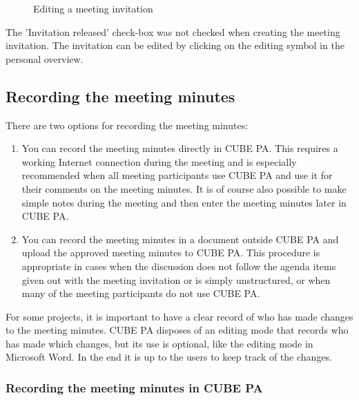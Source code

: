 \begin{figure}[H]
\caption{Editing a meeting invitation}
\end{figure}

\begin{small}
The 'Invitation released' check-box was not checked when creating the meeting invitation. The invitation can be edited by clicking on the editing symbol in the personal overview.
\end{small}


\subsection{Recording the meeting minutes}

There are two options for recording the meeting minutes:

\begin{enumerate}
\item
You can record the meeting minutes directly in CUBE PA. This requires a working Internet connection during the meeting and is especially recommended when all meeting participants use CUBE PA and use it for their comments on the meeting minutes. It is of course also possible to make simple notes during the meeting and then enter the meeting minutes later in CUBE PA.
\item
You can record the meeting minutes in a document outside CUBE PA and upload the approved meeting minutes to CUBE PA. This procedure is appropriate in cases when the discussion does not follow the agenda items given out with the meeting invitation or is simply unstructured, or when many of the meeting participants do not use CUBE PA.
\end{enumerate}

For some projects, it is important to have a clear record of who has made changes to the meeting minutes. CUBE PA disposes of an editing mode that records who has made which changes, but its use is optional, like the editing mode in Microsoft Word. In the end it is up to the users to keep track of the changes.

\subsubsection{Recording the meeting minutes in CUBE PA}

